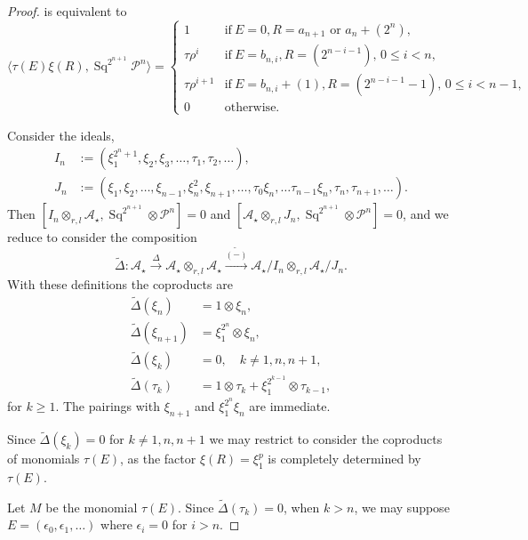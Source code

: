\documentclass[11pt,hyp]{nyjm}
\newcommand{\A}{\mathcal{A}}
\newcommand{\PP}{\mathcal{P}}
\newcommand{\tensor}{\otimes}
\newcommand{\DeltaT}{\widetilde{\Delta}}
\newcommand{\Sq}{\operatorname{Sq}}
\theoremstyle{theoremstyle}
\theoremstyle{definition}
\theoremstyle{theoremstyle}
\begin{document}
\begin{proof}
   is equivalent to 
  \[
  \langle \tau(E)\xi(R), \Sq^{2^{n+1}} \PP^n \rangle = \begin{cases}
    1 & \text{if}\ E=0, R=a_{n+1} \text{ or } a_n + (2^n), \\
    \tau \rho^i & \text{if}\ E=b_{n,i}, R=(2^{n-i - 1}),\, 0 \leq i < n, \\
    \tau \rho^{i+1} & \text{if}\ E=b_{n,i} + (1), R=(2^{n-i - 1} - 1),\, 0 \leq i < n-1, \\
    0 & \text{otherwise}.
    \end{cases}
  \]
  
  Consider the ideals,
  \begin{align*}
    I_n &:= (\xi_1^{2^{n}+1}, \xi_2, \xi_3, \dots, \tau_1, \tau_2, \dots), \\
    J_n &:= (\xi_1, \xi_2, \dots, \xi_{n-1}, \xi_n^2, \xi_{n+1}, \dots, \tau_0\xi_n, \dots \tau_{n-1}\xi_n, \tau_{n}, \tau_{n+1}, \dots).
  \end{align*}
  Then $[I_n \tensor_{r,l} \A_\star, \Sq^{2^{n+1}} \tensor \PP^n ] = 0$
  and $[\A_\star \tensor_{r,l} J_n, \Sq^{2^{n+1}} \tensor \PP^n] = 0$,
  and we reduce to consider the composition
  \[
  \DeltaT : \A_\star \xrightarrow{\Delta} \A_\star \tensor_{r,l} \A_\star \xrightarrow{\widetilde{(-)}} \A_\star/I_n \tensor_{r,l} \A_\star/J_n.
  \]
  With these definitions the coproducts are
  \begin{align*}
    \DeltaT (\xi_n) &= 1 \tensor \xi_n, \\
    \DeltaT (\xi_{n+1}) &= \xi_1^{2^{n}} \tensor \xi_{n}, \\
    \DeltaT (\xi_k) &= 0,\quad k\neq 1, n, n+1, \\
    \DeltaT (\tau_k) &= 1 \tensor \tau_k + \xi_1^{2^{k-1}} \tensor \tau_{k-1},
  \end{align*}
  for $k \geq 1$.
  The pairings with $\xi_{n+1}$ and $\xi_{1}^{2^n}\xi_{n}$ are immediate.

  Since $\DeltaT(\xi_k) = 0$ for $k \neq 1, n,n+1$ we may restrict to consider the coproducts of monomials $\tau(E)$,
  as the factor $\xi(R) = \xi_{1}^{p}$ is completely determined by $\tau(E)$.

  Let $M$ be the monomial $\tau(E)$.
  Since $\DeltaT(\tau_{k}) = 0$, when $ k > n$,
  we may suppose $E=(\epsilon_0, \epsilon_1, \dots)$ where $\epsilon_i = 0$ for $i > n$.


\end{proof}
\end{document}
